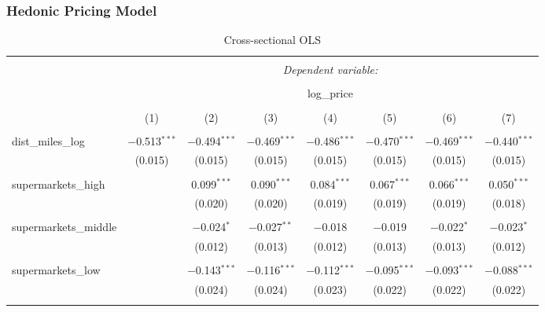 \documentclass{article}
\begin{document}
\subsubsection{Hedonic Pricing Model} \label{subsubsection:result:hedonic}
\begin{table}[t] \centering 
  \caption{Cross-sectional OLS} 
  \label{table:hedonic} 
\small 
\begin{tabular}{@{\extracolsep{-10pt}}lccccccc} 
\\[-1.8ex]\hline 
\hline \\[-1.8ex] 
 & \multicolumn{7}{c}{\textit{Dependent variable:}} \\ 
\cline{2-8} 
\\[-1.8ex] & \multicolumn{7}{c}{log\_price} \\ 
\\[-1.8ex] & (1) & (2) & (3) & (4) & (5) & (6) & (7)\\ 
\hline \\[-1.8ex] 
 dist\_miles\_log & $-$0.513$^{***}$ & $-$0.494$^{***}$ & $-$0.469$^{***}$ & $-$0.486$^{***}$ & $-$0.470$^{***}$ & $-$0.469$^{***}$ & $-$0.440$^{***}$ \\ 
  & (0.015) & (0.015) & (0.015) & (0.015) & (0.015) & (0.015) & (0.015) \\ 
  & & & & & & & \\ 
 supermarkets\_high &  & 0.099$^{***}$ & 0.090$^{***}$ & 0.084$^{***}$ & 0.067$^{***}$ & 0.066$^{***}$ & 0.050$^{***}$ \\ 
  &  & (0.020) & (0.020) & (0.019) & (0.019) & (0.019) & (0.018) \\ 
  & & & & & & & \\ 
 supermarkets\_middle &  & $-$0.024$^{*}$ & $-$0.027$^{**}$ & $-$0.018 & $-$0.019 & $-$0.022$^{*}$ & $-$0.023$^{*}$ \\ 
  &  & (0.012) & (0.013) & (0.012) & (0.013) & (0.013) & (0.012) \\ 
  & & & & & & & \\ 
 supermarkets\_low &  & $-$0.143$^{***}$ & $-$0.116$^{***}$ & $-$0.112$^{***}$ & $-$0.095$^{***}$ & $-$0.093$^{***}$ & $-$0.088$^{***}$ \\ 
  &  & (0.024) & (0.024) & (0.023) & (0.022) & (0.022) & (0.022) \\ 
  & & & & & & & \\ 

\end{tabular}
\end{table}
\end{document}

